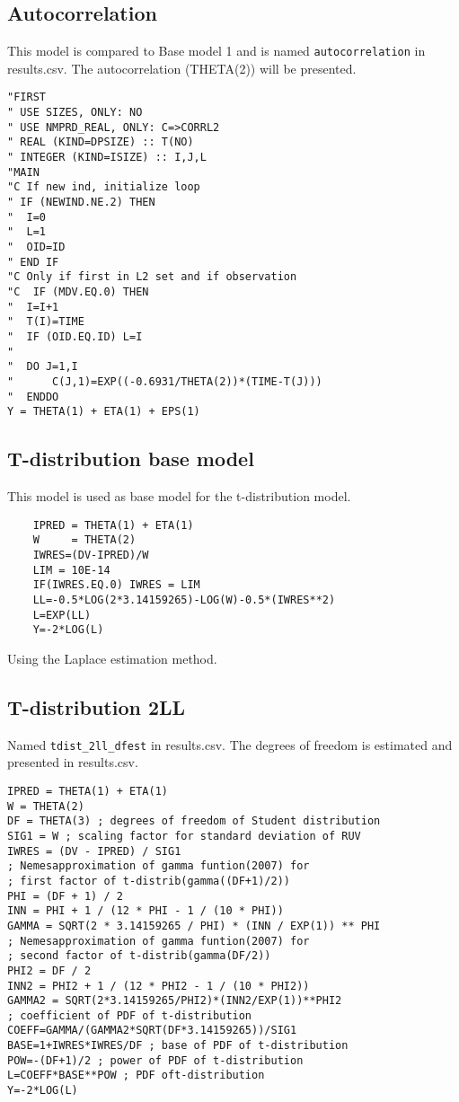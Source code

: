 \subsection{Autocorrelation}
This model is compared to Base model 1 and is named \verb|autocorrelation| in results.csv. The autocorrelation (THETA(2)) will be presented.
\begin{verbatim}
"FIRST
" USE SIZES, ONLY: NO
" USE NMPRD_REAL, ONLY: C=>CORRL2
" REAL (KIND=DPSIZE) :: T(NO)
" INTEGER (KIND=ISIZE) :: I,J,L
"MAIN
"C If new ind, initialize loop
" IF (NEWIND.NE.2) THEN
"  I=0
"  L=1
"  OID=ID
" END IF
"C Only if first in L2 set and if observation
"C  IF (MDV.EQ.0) THEN
"  I=I+1
"  T(I)=TIME
"  IF (OID.EQ.ID) L=I
"
"  DO J=1,I
"      C(J,1)=EXP((-0.6931/THETA(2))*(TIME-T(J)))
"  ENDDO
Y = THETA(1) + ETA(1) + EPS(1)
\end{verbatim}

\subsection{T-distribution base model}
This model is used as base model for the t-distribution model.

\begin{verbatim}
    IPRED = THETA(1) + ETA(1)
	W     = THETA(2)
	IWRES=(DV-IPRED)/W
	LIM = 10E-14
	IF(IWRES.EQ.0) IWRES = LIM
	LL=-0.5*LOG(2*3.14159265)-LOG(W)-0.5*(IWRES**2)
	L=EXP(LL)
	Y=-2*LOG(L)
\end{verbatim}

Using the Laplace estimation method.

\subsection{T-distribution 2LL}
Named \verb|tdist_2ll_dfest| in results.csv. The degrees of freedom is estimated and presented in results.csv.

\begin{verbatim}
IPRED = THETA(1) + ETA(1)
W = THETA(2)
DF = THETA(3) ; degrees of freedom of Student distribution
SIG1 = W ; scaling factor for standard deviation of RUV
IWRES = (DV - IPRED) / SIG1
; Nemesapproximation of gamma funtion(2007) for
; first factor of t-distrib(gamma((DF+1)/2))
PHI = (DF + 1) / 2
INN = PHI + 1 / (12 * PHI - 1 / (10 * PHI))
GAMMA = SQRT(2 * 3.14159265 / PHI) * (INN / EXP(1)) ** PHI
; Nemesapproximation of gamma funtion(2007) for
; second factor of t-distrib(gamma(DF/2))
PHI2 = DF / 2
INN2 = PHI2 + 1 / (12 * PHI2 - 1 / (10 * PHI2))
GAMMA2 = SQRT(2*3.14159265/PHI2)*(INN2/EXP(1))**PHI2
; coefficient of PDF of t-distribution
COEFF=GAMMA/(GAMMA2*SQRT(DF*3.14159265))/SIG1
BASE=1+IWRES*IWRES/DF ; base of PDF of t-distribution
POW=-(DF+1)/2 ; power of PDF of t-distribution
L=COEFF*BASE**POW ; PDF oft-distribution
Y=-2*LOG(L)
\end{verbatim}

